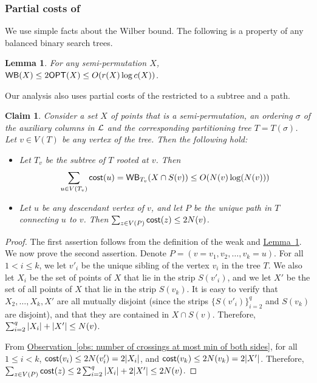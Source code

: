 \documentclass[11pt]{article}
\numberwithin{equation}{section}
\newtheorem{lemma}[theorem]{Lemma}
\newtheorem{claim}[theorem]{Claim}
\theoremstyle{definition}
\theoremstyle{plain}
\newcommand{\expref}[2]{\hyperref[#2]{#1~\ref{#2}}}
\begin{document}
\subsubsection{Partial costs of \WBone}

We use simple facts about the Wilber bound. The following is a property of any balanced binary search trees. 

\begin{lemma}\label{cor: upper bound on WB}
	For any semi-permutation $X$, 
	$\mathsf{WB}(X)\leq 2\mbox{\sf OPT}(X) \leq O(r(X) \log c(X))$.
\end{lemma}

Our analysis also uses partial costs of the \WBone restricted to a subtree and a path. 

\begin{claim}\label{claim: bounds on WB for path and subtree}
Consider a set $X$ of points that is a semi-permutation, an ordering $\sigma$ of the auxiliary columns in ${\mathcal L}$ and the corresponding partitioning tree $T=T(\sigma)$.  
%
 Let $v\in V(T)$ be any vertex of the tree. Then the following hold:
	\begin{itemize}
\item Let $T_v$ be the %
subtree   %
of $T$ rooted at $v$. Then $$\sum_{u\in V(T_v)}\mathsf{cost}(u) = \mathsf{WB}_{T_v}(X \cap S(v)) \leq O(N(v)\log(N(v)))$$
		\item Let $u$ be any descendant vertex of $v$, and let $P$ be the unique path in $T$ connecting $u$ to $v$. Then $\sum_{z\in V(P)}\mathsf{cost}(z)\leq 2N(v)$.
	\end{itemize}
\end{claim}

\begin{proof}
    The first assertion follows from the definition of the weak \WBone and \expref{Lemma}{cor: upper bound on WB}. We now prove the second assertion. Denote $P=(v=v_1,v_2,\ldots,v_k=u)$. For all $1<i\leq k$, we let $v'_i$ be the unique sibling of the vertex $v_i$ in the tree $T$. We also let $X_i$ be the set of points of $X$ that lie in the strip $S(v'_i)$, and we let $X'$ be the set of all points of $X$ that lie in the strip $S(v_k)$. 
It is easy to verify that $X_2,\ldots,X_k,X'$ are all mutually disjoint (since the strips $\{S(v'_i)\}_{i=2}^q$ and $S(v_k)$ are disjoint), and that they are contained in $X\cap S(v)$. 
Therefore, $\sum_{i=2}^q|X_i|+|X'|\leq N(v)$.
	
	From \expref{Observation}{obs: number of crossings at most min of both sides}, for all $1\leq i<k$, $\mathsf{cost}(v_i)\leq 2N(v'_i)=2|X_i|$, and $\mathsf{cost}(v_k)\leq 2N(v_k)=2|X'|$. Therefore, $\sum_{z\in V(P)}\mathsf{cost}(z)\leq 2\sum_{i=2}^q|X_i|+2|X'|\leq 2N(v)$.
\end{proof}
\end{document}
